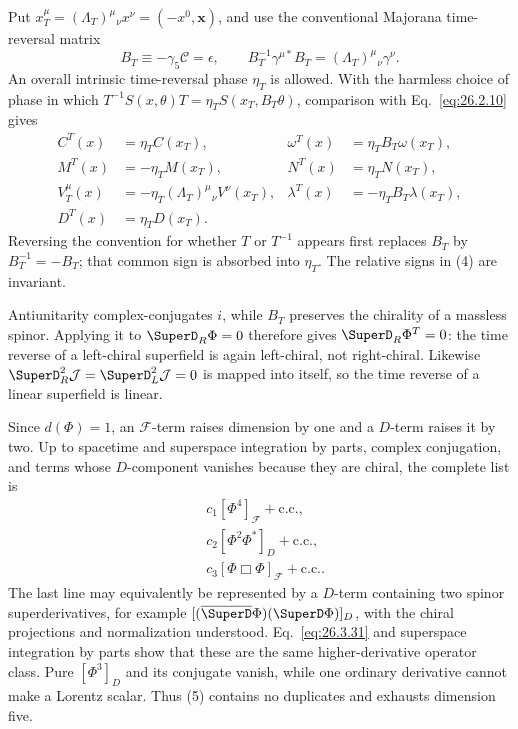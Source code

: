 \begin{enumerate}
  Put \(x_T^\mu=(\Lambda_T)^\mu{}_\nu x^\nu=(-x^0,\mathbf x)\), and use the
  conventional Majorana time-reversal matrix
  \[
    B_T\equiv-\gamma_5\mathcal C=\epsilon,\qquad
    B_T^{-1}\gamma^{\mu *}B_T
       =(\Lambda_T)^\mu{}_\nu\gamma^\nu .
  \]
  An overall intrinsic time-reversal phase \(\eta_T\) is allowed.  With the
  harmless choice of phase in which
  \(T^{-1}S(x,\theta)T=\eta_T S(x_T,B_T\theta)\), comparison with
  Eq.~\eqref{eq:26.2.10} gives
  \[
  \begin{aligned}
    C^T(x)&=\eta_T C(x_T),&
    \omega^T(x)&=\eta_T B_T\omega(x_T),\\
    M^T(x)&=-\eta_T M(x_T),&
    N^T(x)&=\eta_T N(x_T),\\
    V_T^\mu(x)&=-\eta_T(\Lambda_T)^\mu{}_\nu V^\nu(x_T),&
    \lambda^T(x)&=-\eta_T B_T\lambda(x_T),\\
    D^T(x)&=\eta_TD(x_T).&&
  \end{aligned}
  \tag{4}
  \]
  Reversing the convention for whether \(T\) or \(T^{-1}\) appears first
  replaces \(B_T\) by \(B_T^{-1}=-B_T\); that common sign is absorbed into
  \(\eta_T\).  The relative signs in (4) are invariant.

  Antiunitarity complex-conjugates \(i\), while \(B_T\) preserves the
  chirality of a massless spinor.  Applying it to
  \(\SuperD_R\Phi=0\) therefore gives
  \(\SuperD_R\Phi^T=0\): the time reverse of a left-chiral superfield is
  again left-chiral, not right-chiral.  Likewise
  \(\SuperD_R^2\mathcal J=\SuperD_L^2\mathcal J=0\) is mapped into itself,
  so the time reverse of a linear superfield is linear.

  Since \(d(\Phi)=1\), an \(\mathcal F\)-term raises dimension by one and a
  \(D\)-term raises it by two.  Up to spacetime and superspace integration
  by parts, complex conjugation, and terms whose \(D\)-component vanishes
  because they are chiral, the complete list is
  \[
  \begin{split}
    &c_1[\Phi^4]_{\mathcal F}+\mathrm{c.c.},\\
    &c_2[\Phi^2\Phi^*]_D+\mathrm{c.c.},\\
    &c_3[\Phi\Box\Phi]_{\mathcal F}+\mathrm{c.c.}.
  \end{split}
  \tag{5}
  \]
  The last line may equivalently be represented by a \(D\)-term containing
  two spinor superderivatives, for example
  \([(\overline{\SuperD}\Phi)(\SuperD\Phi)]_D\), with the chiral projections
  and normalization understood.  Eq.~\eqref{eq:26.3.31} and superspace
  integration by parts show that these are the same higher-derivative
  operator class.  Pure \([\Phi^3]_D\) and its conjugate vanish, while one
  ordinary derivative cannot make a Lorentz scalar.  Thus (5) contains no
  duplicates and exhausts dimension five.


\end{enumerate}
